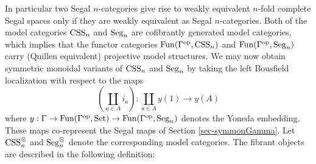 \documentclass{amsart}
\begin{document}
%
%


In particular two Segal $n$-categories give rise to weakly equivalent $n$-fold complete Segal spaces only if they are weakly equivalent as Segal $n$-categories.
Both of the model categories $\mathrm{CSS}_n$ and $\mathrm{Seg}_n$ are cofibrantly generated model categories, which implies that the functor categories $\operatorname{Fun}(\Gamma^{\mathrm{op}}, \mathrm{CSS}_n)$ and $\operatorname{Fun}(\Gamma^{\mathrm{op}}, \mathrm{Seg}_n)$ carry (Quillen equivalent) projective model structures. We may now obtain symmetric monoidal variants of $\mathrm{CSS}_n$ and $\mathrm{Seg}_n$ by taking the left Bousfield localization with respect to the maps
\begin{equation*}
	(\coprod_{a \in A} i_a) :   \coprod_{a \in A} y(1) \to y(A)
\end{equation*}
where $y: \Gamma \to \operatorname{Fun}(\Gamma^{\mathrm{op}}, \mathrm{Set}) \to \operatorname{Fun}(\Gamma^{\mathrm{op}}, \mathrm{Seg}_n)$ denotes the Yoneda embedding. These maps co-represent the Segal maps of Section \ref{sec-symmonGamma}. Let $\mathrm{CSS}_n^{\otimes}$ and $\mathrm{Seg}_n^{\otimes}$ denote the corresponding model categories. 
The fibrant objects are described in the following definition:
\end{document}
